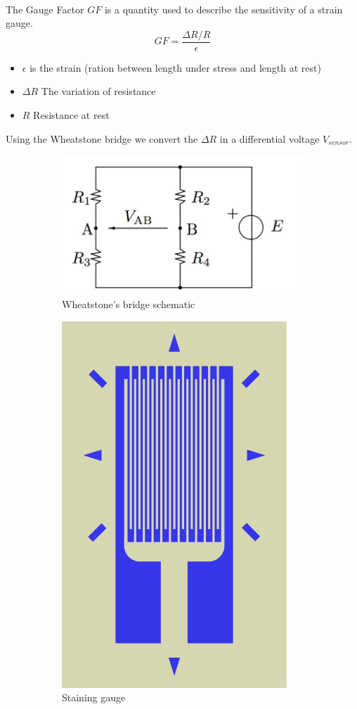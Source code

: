 \documentclass{article}[12pt]
\begin{document}
\paragraph{}
The Gauge Factor $GF$ is a quantity used to describe the sensitivity of a strain gauge.
\begin{equation}
GF=\dfrac{\Delta R/R}{\epsilon}
\end{equation}
\begin{itemize}
\item $\epsilon$ is the strain (ration between length under stress and length at rest)
\item $\Delta R$ The variation of resistance
\item $R$ Resistance at rest
\end{itemize}
Using the Wheatstone bridge we convert the $\Delta R$ in a differential voltage $V_{sensor}$.
\begin{figure}[H]
\centering
\begin{subfigure}{.5\textwidth}
  \centering
  \includegraphics[width=.8\linewidth]{figures/wheatstone.jpg}
  \caption{Wheatstone's bridge schematic}
  \label{fig:Wheatstone}
\end{subfigure}%
\begin{subfigure}{.5\textwidth}
  \centering
  \includegraphics[width=.4\linewidth]{figures/Strain_gauge.png}
  \caption{Staining gauge}
  \label{fig:sub2}
\end{subfigure}
\caption{}
\label{fig:test}
\end{figure}
\end{document}
